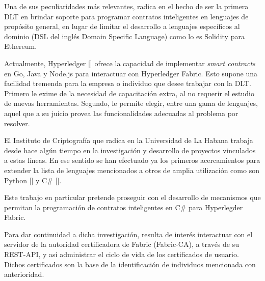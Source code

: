 Una de sus peculiaridades m\'as relevantes, radica en el hecho de ser la primera DLT en brindar soporte para programar contratos inteligentes en lenguajes de prop\'osito general, en lugar de limitar el desarrollo a lenguajes espec\'ificos al dominio (DSL del ingl\'es Domain Specific Language) como lo es Solidity para Ethereum. %


Actualmente, Hyperledger [\cite{hyperledgerorg}] ofrece la capacidad de implementar \emph{smart contracts} en Go, Java y Node.js para interactuar con Hyperledger Fabric. Esto supone una facilidad tremenda para la empresa o individuo que desee trabajar con la DLT. Primero le exime de la necesidad de capacitaci\'on extra, al no requerir el estudio de nuevas herramientas. Segundo, le permite elegir, entre una gama de lenguajes, aquel que a su juicio provea las funcionalidades adecuadas al problema por resolver.%


El Instituto de Criptograf\'ia que radica en la Universidad de La Habana trabaja desde hace alg\'un tiempo en la investigaci\'on y desarrollo de proyectos vinculados a estas l\'ineas. En ese sentido se han efectuado ya los primeros acercamientos para extender la lista de lenguajes mencionados a otros de amplia utilizaci\'on como son Python [\cite{chaincode22python}] y C\# [\cite{chaincode22csharp}].

Este trabajo en particular pretende proseguir con el desarrollo de mecanismos que permitan la programaci\'on de contratos inteligentes en C\# para Hyperlegder Fabric.

Para dar continuidad a dicha investigaci\'on, resulta de inter\'es interactuar con el servidor de la autoridad certificadora de Fabric (Fabric-CA), a trav\'es de su REST-API, y as\'i administrar el ciclo de vida de los certificados de usuario. Dichos certificados son la base de la identificaci\'on de individuos mencionada con anterioridad. 

